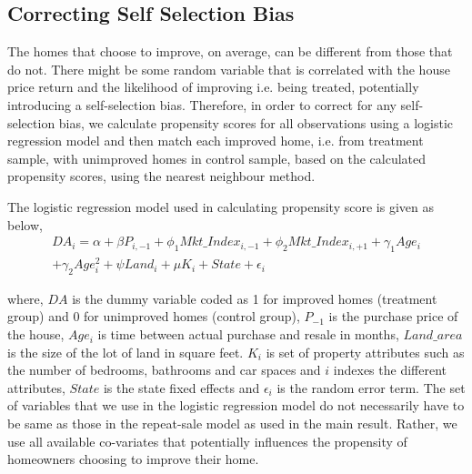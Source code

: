 \documentclass[AEJ,reqno, draftmode]{AEA} %
\begin{document}




\subsection{Correcting Self Selection Bias}

The homes that choose to improve, on average, can be different from those that do not. There might be some random variable that is correlated with the house price return and the likelihood of improving i.e. being treated, potentially introducing a self-selection bias. Therefore, in order to correct for any self-selection bias, we calculate propensity scores for all observations using a logistic regression model and then match each improved home, i.e. from treatment sample, with unimproved homes in control sample, based on the calculated propensity scores, using the nearest neighbour method.

The logistic regression model used in calculating propensity score is given as below, \begin{equation} \label{eqn:logistic}
\begin{aligned}
    DA_i = \alpha + \beta{P_{i,-1}}  + \phi_1{Mkt\_Index_{i,-1}} + \phi_2{Mkt\_Index_{i,+1}} + \gamma_1{Age_i} \\+ \gamma_2{Age_i^2} + \psi{Land_i} + \mu{K_i} + State + \epsilon_i
\end{aligned}
\end{equation}

where, $DA$ is the dummy variable coded as 1 for improved homes (treatment group) and 0 for unimproved homes (control group), $P_{-1}$ is the purchase price of the house, $Age_i$ is time between actual purchase and resale in months, $Land\_area$ is the size of the lot of land in square feet. $K_i$ is set of property attributes such as the number of bedrooms, bathrooms and car spaces and $i$ indexes the different attributes, $State$ is the state fixed effects and $\epsilon_i$ is the random error term. The set of variables that we use in the logistic regression model do not necessarily have to be same as those in the repeat-sale model as used in the main result. Rather, we use all available co-variates that potentially influences the propensity of homeowners choosing to improve their home.
    
\end{document}
